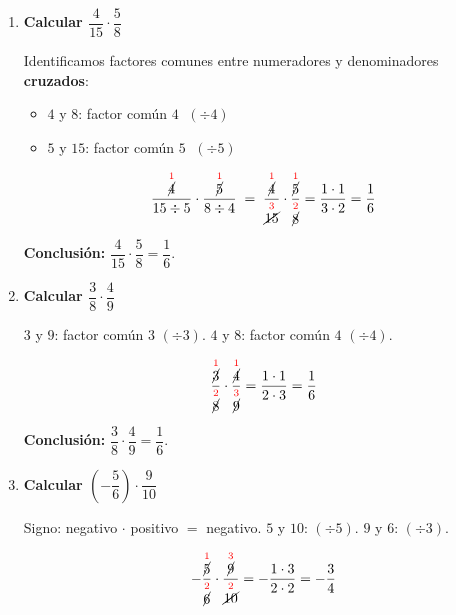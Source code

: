 \documentclass[11pt, letterpaper]{article}
\begin{document}
\begin{tcolorbox}[examplebox, title={Ejemplos --- multiplicaci\'on con simplificaci\'on cruzada}]
\begin{enumerate}[label=\textbf{Ej. \arabic*.}, leftmargin=*, itemsep=16pt]

\item \textbf{Calcular $\dfrac{4}{15} \cdot \dfrac{5}{8}$}

Identificamos factores comunes entre numeradores y denominadores \textbf{cruzados}:
\begin{itemize}[itemsep=2pt]
  \item $4$ y $8$: factor com\'un $4$ $\;(\div 4)$
  \item $5$ y $15$: factor com\'un $5$ $\;(\div 5)$
\end{itemize}

$$\frac{\overset{\textcolor{red}{1}}{\cancel{4}}}{15 \div 5} \cdot \frac{\overset{\textcolor{red}{1}}{\cancel{5}}}{8 \div 4}
\;=\;
\frac{\overset{\textcolor{red}{1}}{\cancel{4}}}{\overset{\textcolor{red}{3}}{\cancel{15}}} \cdot \frac{\overset{\textcolor{red}{1}}{\cancel{5}}}{\overset{\textcolor{red}{2}}{\cancel{8}}} = \frac{1 \cdot 1}{3 \cdot 2} = \frac{1}{6}$$

\textbf{Conclusi\'on:} $\dfrac{4}{15}\cdot\dfrac{5}{8}=\dfrac{1}{6}$. \checkmark

\item \textbf{Calcular $\dfrac{3}{8} \cdot \dfrac{4}{9}$}

$3$ y $9$: factor com\'un $3$ $(\div 3)$. \quad $4$ y $8$: factor com\'un $4$ $(\div 4)$.

$$\frac{\overset{\textcolor{red}{1}}{\cancel{3}}}{\overset{\textcolor{red}{2}}{\cancel{8}}} \cdot \frac{\overset{\textcolor{red}{1}}{\cancel{4}}}{\overset{\textcolor{red}{3}}{\cancel{9}}} = \frac{1 \cdot 1}{2 \cdot 3} = \frac{1}{6}$$

\textbf{Conclusi\'on:} $\dfrac{3}{8}\cdot\dfrac{4}{9}=\dfrac{1}{6}$. \checkmark

\item \textbf{Calcular $\left(-\dfrac{5}{6}\right) \cdot \dfrac{9}{10}$}

Signo: negativo $\cdot$ positivo $=$ negativo. \quad $5$ y $10$: $(\div5)$. \quad $9$ y $6$: $(\div3)$.

$$-\frac{\overset{\textcolor{red}{1}}{\cancel{5}}}{\overset{\textcolor{red}{2}}{\cancel{6}}} \cdot \frac{\overset{\textcolor{red}{3}}{\cancel{9}}}{\overset{\textcolor{red}{2}}{\cancel{10}}} = -\frac{1\cdot3}{2\cdot2} = -\frac{3}{4}$$


\end{enumerate}
\end{tcolorbox}
\end{document}
